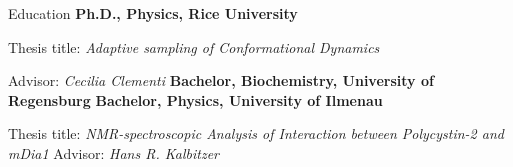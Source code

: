 \begin{rubric}{Education}
%
\entry*[2014 -- 2020]%
	\textbf{Ph.D., Physics, Rice University}
	\par Thesis title: \emph{Adaptive sampling of Conformational Dynamics}
  \par Advisor: \emph{Cecilia Clementi}
%
\entry*[2012 -- 2014]%
	\textbf{Bachelor, Biochemistry, University of Regensburg} 
%
\entry*[2012]%
  \textbf{Bachelor, Physics, University of Ilmenau}
  \par Thesis title: \emph{NMR-spectroscopic Analysis of Interaction between Polycystin-2 and mDia1}  Advisor: \emph{Hans R. Kalbitzer}
\end{rubric}
